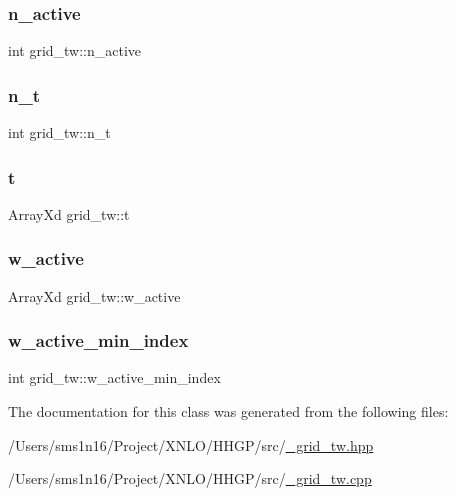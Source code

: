 \subsubsection{\texorpdfstring{n\+\_\+active}{n\_active}}
{\footnotesize\ttfamily int grid\+\_\+tw\+::n\+\_\+active}

\mbox{\label{classgrid__tw_ac121ce740479f628bdaa54627540ad42}} 
\subsubsection{\texorpdfstring{n\+\_\+t}{n\_t}}
{\footnotesize\ttfamily int grid\+\_\+tw\+::n\+\_\+t}

\mbox{\label{classgrid__tw_a918f1e6d18056d0f6da08fe01089b9b0}} 
\subsubsection{\texorpdfstring{t}{t}}
{\footnotesize\ttfamily Array\+Xd grid\+\_\+tw\+::t}

\mbox{\label{classgrid__tw_a66922766c9dfe5c4667e55e678b134b9}} 
\subsubsection{\texorpdfstring{w\+\_\+active}{w\_active}}
{\footnotesize\ttfamily Array\+Xd grid\+\_\+tw\+::w\+\_\+active}

\mbox{\label{classgrid__tw_a27d987fb3c8cbacf9cd152b83477f0d9}} 
\subsubsection{\texorpdfstring{w\+\_\+active\+\_\+min\+\_\+index}{w\_active\_min\_index}}
{\footnotesize\ttfamily int grid\+\_\+tw\+::w\+\_\+active\+\_\+min\+\_\+index}



The documentation for this class was generated from the following files\+:\begin{DoxyCompactItemize}
\item 
/\+Users/sms1n16/\+Project/\+X\+N\+L\+O/\+H\+H\+G\+P/src/\hyperlink{__grid__tw_8hpp}{\+\_\+grid\+\_\+tw.\+hpp}\item 
/\+Users/sms1n16/\+Project/\+X\+N\+L\+O/\+H\+H\+G\+P/src/\hyperlink{__grid__tw_8cpp}{\+\_\+grid\+\_\+tw.\+cpp}\end{DoxyCompactItemize}
